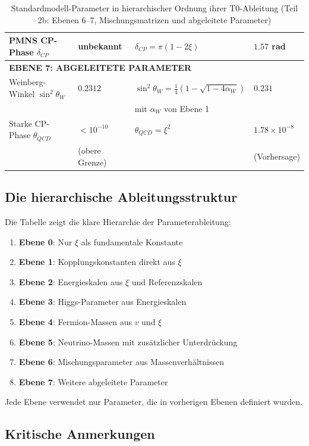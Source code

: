 \begin{table}[htbp]
{\begin{tabular}{p{5cm}p{3cm}p{2.7cm}p{2.7cm}}
			PMNS CP-Phase $\delta_{CP}$ & unbekannt & $\delta_{CP} = \pi(1 - 2\xi)$ & $1.57$ rad \\
			\midrule
			\multicolumn{4}{l}{\textbf{EBENE 7: ABGELEITETE PARAMETER}} \\
			\midrule
			Weinberg-Winkel $\sin^2\theta_W$ & $0.2312$ & $\sin^2\theta_W = \frac{1}{4}(1-\sqrt{1-4\alpha_W})$ & $0.231$ \\
			& & mit $\alpha_W$ von Ebene 1 & \\[0.3em]
			Starke CP-Phase $\theta_{QCD}$ & $< 10^{-10}$ & $\theta_{QCD} = \xi^{2}$ & $1.78 \times 10^{-8}$ \\
			& (obere Grenze) & & (Vorhersage) \\
			\bottomrule
		\end{tabular}%
	}
	\caption{Standardmodell-Parameter in hierarchischer Ordnung ihrer T0-Ableitung (Teil 2b: Ebenen 6--7, Mischungsmatrizen und abgeleitete Parameter)}
	\label{tab:sm-params-2b}
\end{table}

\subsection{Die hierarchische Ableitungsstruktur}
\label{subsec:hierarchical_structure}

Die Tabelle zeigt die klare Hierarchie der Parameterableitung:

\begin{enumerate}
	\item \textbf{Ebene 0}: Nur $\xi$ als fundamentale Konstante
	\item \textbf{Ebene 1}: Kopplungskonstanten direkt aus $\xi$
	\item \textbf{Ebene 2}: Energieskalen aus $\xi$ und Referenzskalen
	\item \textbf{Ebene 3}: Higgs-Parameter aus Energieskalen
	\item \textbf{Ebene 4}: Fermion-Massen aus $v$ und $\xi$
	\item \textbf{Ebene 5}: Neutrino-Massen mit zusätzlicher Unterdrückung
	\item \textbf{Ebene 6}: Mischungsparameter aus Massenverhältnissen
	\item \textbf{Ebene 7}: Weitere abgeleitete Parameter
\end{enumerate}

Jede Ebene verwendet nur Parameter, die in vorherigen Ebenen definiert wurden.

\subsection{Kritische Anmerkungen}
\label{subsec:critical_notes}

